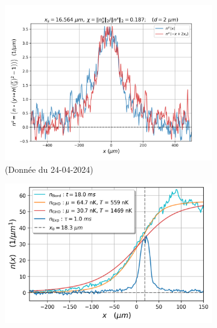 \documentclass[submission, Phys]{SciPost}
\begin{document}
		\begin{figure}[ht]
			\centering
			\begin{subfigure}[b]{0.24\textwidth}
				\includegraphics[width=\textwidth]{Figures/article_asymetrie_24-04-2024}
			\caption{(Donnée du 24-04-2024)}
   			\label{fig:asymetrie}	
			\end{subfigure}
			\hfill
    		\begin{subfigure}[b]{0.24\textwidth}
   				 \includegraphics[width=\textwidth]{Figures/article_simul_deformation_1_24-04-2024}
        			\caption{}
        		\label{fig:simul_deformation}
   			\end{subfigure}
    		\hfill
    		\begin{subfigure}[b]{0.24\textwidth}
        		\centering

\end{subfigure}
\end{figure}
\end{document}
